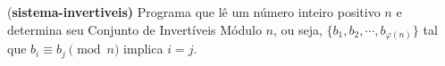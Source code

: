 \item{(\bf sistema-invertiveis)}
		Programa que lê um número inteiro positivo $n$ e determina seu Conjunto de Invertíveis Módulo $n$, ou seja, 
		$\{b_1,b_2,\cdots,b_{\varphi(n)}\}$ tal que $b_i \equiv b_j \pmod{n}$ implica $i= j$.
